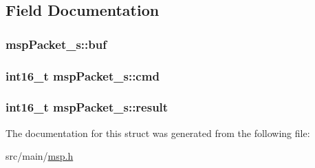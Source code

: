 \subsection{Field Documentation}
\hypertarget{structmspPacket__s_ae835bf274f4b901c292ae43a65c45da3}{
\subsubsection[{buf}]{ msp\+Packet\+\_\+s\+::buf}}\label{structmspPacket__s_ae835bf274f4b901c292ae43a65c45da3}
\hypertarget{structmspPacket__s_a58b0239164891ae01fe7aaf34712bd6d}{
\subsubsection[{cmd}]{\setlength{\rightskip}{0pt plus 5cm}int16\+\_\+t msp\+Packet\+\_\+s\+::cmd}}\label{structmspPacket__s_a58b0239164891ae01fe7aaf34712bd6d}
\hypertarget{structmspPacket__s_aeef851f9aadd6d89a87e5d336be6f7e3}{
\subsubsection[{result}]{\setlength{\rightskip}{0pt plus 5cm}int16\+\_\+t msp\+Packet\+\_\+s\+::result}}\label{structmspPacket__s_aeef851f9aadd6d89a87e5d336be6f7e3}


The documentation for this struct was generated from the following file\+:\begin{DoxyCompactItemize}
\item 
src/main/\hyperlink{msp_8h}{msp.\+h}\end{DoxyCompactItemize}
